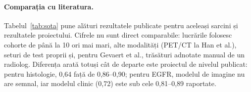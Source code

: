 \documentclass[11pt, a4paper]{article}
\begin{document}
\paragraph{Comparația cu literatura.} Tabelul~\ref{tab:sota} pune alături rezultatele publicate pentru aceleași sarcini și rezultatele proiectului. Cifrele nu sunt direct comparabile: lucrările folosesc cohorte de până la 10 ori mai mari, alte modalități (PET/CT la Han et al.), seturi de test proprii și, pentru Gevaert et al., trăsături adnotate manual de un radiolog. Diferența arată totuși cât de departe este proiectul de nivelul publicat: pentru histologie, 0,64 față de 0,86--0,90; pentru EGFR, modelul de imagine nu are semnal, iar modelul clinic (0,72) este sub cele 0,81--0,89 raportate.

\begin{table}[h]
\centering
{}
\caption{Comparația cu literatura (\textit{state of the art}). Proiectul: NSCLC-Radiogenomics, 115--172 de pacienți, validare încrucișată în 5 fold-uri.}
\label{tab:sota}
\end{table}
\end{document}
